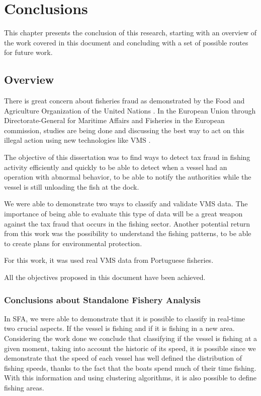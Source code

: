 % 
%  
%
\chapter{Conclusions}
\label{cha:conclusion}


This chapter presents the conclusion of this research, starting with an overview of the work covered in this document and concluding with a set of possible routes for future work.

\section{Overview} %
\label{sec:overview}

There is great concern about fisheries fraud as demonstrated by the Food and Agriculture Organization of the United Nations \cite{FAOFraud}.
In the European Union through Directorate-General for Maritime Affairs and Fisheries in the European commission, studies are being done and discussing the best way to act on this illegal action using new technologies like VMS \cite{WEBSITE:ECControl}.

The objective of this dissertation was to find ways to detect tax fraud in fishing activity efficiently and quickly to be able to detect when a vessel had an operation with abnormal behavior, to be able to notify the authorities while the vessel is still unloading the fish at the dock.

We were able to demonstrate two ways to classify and validate VMS data. The importance of being able to evaluate this type of data will be a great weapon against the tax fraud that occurs in the fishing sector. Another potential return from this work was the possibility to understand the fishing patterns, to be able to create plans for environmental protection.

For this work, it was used real VMS data from Portuguese fisheries.

All the objectives proposed in this document have been achieved.

\subsection{Conclusions about Standalone Fishery Analysis} %
\label{sec:con_sfa}

In SFA, we were able to demonstrate that it is possible to classify in real-time two crucial aspects. If the vessel is fishing and if it is fishing in a new area.\\
Considering the work done we conclude that classifying if the vessel is fishing at a given moment, taking into account  the historic of its speed, it is possible since we demonstrate that the speed of each vessel has well defined the distribution of fishing speeds, thanks to the fact that the boats spend much of their time fishing.
With this information and using clustering algorithms, it is also possible to define fishing areas.\\

